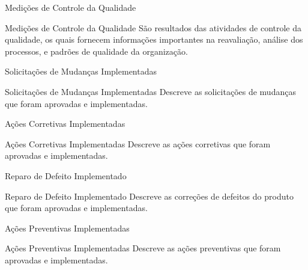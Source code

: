 \documentclass[xcolor=x11names,compress]{beamer}
\begin{document}
\begin{frame}{Medições de Controle da Qualidade}

\begin{alertblock}{Medições de Controle da Qualidade}
São resultados das atividades de controle da qualidade, os quais fornecem informações importantes na reavaliação, análise dos processos, e padrões de qualidade da organização.
\end{alertblock}

\end{frame}

\begin{frame}{Solicitações de Mudanças Implementadas}

\begin{alertblock}{Solicitações de Mudanças Implementadas}
Descreve as solicitações de mudanças que foram aprovadas e implementadas.
\end{alertblock}

\end{frame}

\begin{frame}{Ações Corretivas Implementadas}

\begin{alertblock}{Ações Corretivas Implementadas}
Descreve as ações corretivas que foram aprovadas e implementadas.
\end{alertblock}

\end{frame}

\begin{frame}{Reparo de Defeito Implementado}

\begin{alertblock}{Reparo de Defeito Implementado}
Descreve as correções de defeitos do produto que foram aprovadas e implementadas.
\end{alertblock}

\end{frame}

\begin{frame}{Ações Preventivas Implementadas}

\begin{alertblock}{Ações Preventivas Implementadas}
Descreve as ações preventivas que foram aprovadas e implementadas.
\end{alertblock}

\end{frame}
\end{document}
